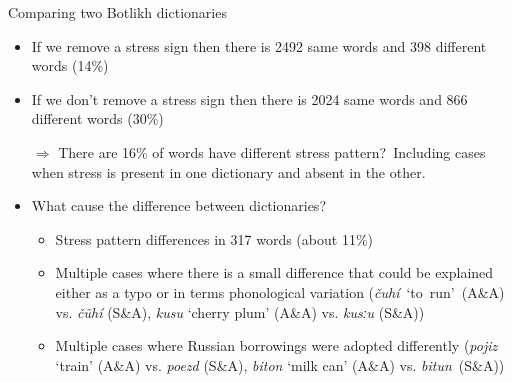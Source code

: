 \documentclass[13pt, t]{beamer}
\begin{document}
\begin{frame}{Comparing two Botlikh dictionaries}
\begin{itemize}
\item If we remove a stress sign then there is 2492 same words and 398 different words (14\%)
\item If we don't remove a stress sign then there is 2024 same words and 866 different words (30\%)
\item[\color{colorblue} $\Rightarrow$] There are 16\% of words have different stress pattern?\pause\ Including cases when stress is present in one dictionary and absent in the other. \pause 
\item What cause the difference between dictionaries?
\begin{itemize}
\item Stress pattern differences in 317 words (about 11\%)
\item Multiple cases where there is a small difference that could be explained either as a typo or in terms phonological variation (\textit{čuhí}~‘to~run’~(A\&A) vs. \textit{čũhí} (S\&A), \textit{kusu} ‘cherry plum’ (A\&A) vs. \textit{kusːu} (S\&A))
\item Multiple cases where Russian borrowings were adopted differently (\textit{pojiz} ‘train’ (A\&A) vs. \textit{poezd} (S\&A), \textit{biton} ‘milk can’ (A\&A) vs. \textit{bitun}~(S\&A))
\end{itemize}
\end{itemize}
\end{frame}
\end{document}
